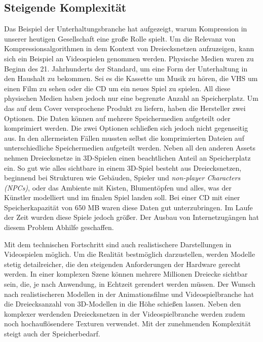 \subsection{Steigende Komplexität}
\label{subsec:steigende_komplexität}
Das Beispiel der Unterhaltungsbranche hat aufgezeigt, warum Kompression in unserer heutigen Gesellschaft eine große Rolle spielt.
Um die Relevanz von Kompressionsalgorithmen in dem Kontext von Dreiecksnetzen aufzuzeigen, kann sich ein Beispiel an Videospielen genommen werden.
Physische Medien waren zu Beginn des 21. Jahrhunderts der Standard, um eine Form der Unterhaltung in den Haushalt zu bekommen.
Sei es die Kassette um Musik zu hören, die VHS um einen Film zu sehen oder die CD um ein neues Spiel zu spielen.
All diese physischen Medien haben jedoch nur eine begrenzte Anzahl an Speicherplatz.
Um das auf dem Cover versprochene Produkt zu liefern, haben die Hersteller zwei Optionen.
Die Daten können auf mehrere Speichermedien aufgeteilt oder komprimiert werden.
Die zwei Optionen schließen sich jedoch nicht gegenseitig aus.
In den allermeisten Fällen mussten selbst die komprimierten Dateien auf unterschiedliche Speichermedien aufgeteilt werden.
Neben all den anderen Assets nehmen Dreiecksnetze in 3D-Spielen einen beachtlichen Anteil an Speicherplatz ein.
So gut wie alles sichtbare in einem 3D-Spiel besteht aus Dreiecksnetzen, beginnend bei Strukturen wie Gebäuden, Spieler und \textit{non-player Characters (NPCs)}, oder das Ambiente mit Kisten, Blumentöpfen und alles, was der Künstler modelliert und im finalen Spiel landen soll.
Bei einer CD mit einer Speicherkapazität von 650 MB waren diese Daten gut unterzubringen.
Im Laufe der Zeit wurden diese Spiele jedoch größer.
Der Ausbau von Internetzugängen hat diesem Problem Abhilfe geschaffen. \newline

Mit dem technischen Fortschritt sind auch realistischere Darstellungen in Videospielen möglich.
Um die Realität bestmöglich darzustellen, werden Modelle stetig detailreicher, die den steigenden Anforderungen der Hardware gerecht werden. 
In einer komplexen Szene können mehrere Millionen Dreiecke sichtbar sein, die, je nach Anwendung, in Echtzeit gerendert werden müssen.
Der Wunsch nach realistischeren Modellen in der Animationsfilme und Videospielbranche hat die Dreiecksanzahl von 3D-Modellen in die Höhe schießen lassen.
Neben den komplexer werdenden Dreiecksnetzen in der Videospielbranche werden zudem noch hochauflösendere Texturen verwendet.
Mit der zunehmenden Komplexität steigt auch der Speicherbedarf. \newline

